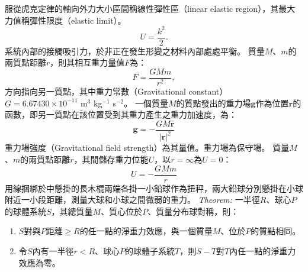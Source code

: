 \documentclass[a4paper,12pt]{article}
\begin{document}
服從虎克定律的軸向外力大小區間稱線性彈性區（linear elastic region），其最大力值稱彈性限度（elastic limit）。
\[U=\frac{k^2}{2}.\]
系統內部的接觸吸引力，於非正在發生形變之材料內部處處平衡。
質量$M$、$m$的兩質點距離$r$，則其相互重力量值$F$為：
\[F=\frac{GMm}{r^2},\]
方向指向另一質點，其中重力常數（Gravitational constant） $G = 6.67430\times 10^{-11}$ m$^3$ kg$^{-1}$ s$^{-2}$。
一個質量$M$的質點發出的重力場$\mathbf{g}$作為位置$\mathbf{r}$的函數，即另一質點在該位置受到其重力產生之重力加速度，為：
\[\mathbf{g}=-\frac{GM\hat{\mathbf{r}}}{|\mathbf{r}|^2}\]
重力場強度（Gravitational field strength）為其量值。重力場為保守場。
質量$M$、$m$的兩質點距離$r$，其間儲存重力位能$U$，以$r=\infty$為$U=0$：
\[U=-\frac{GMm}{r}\]
用線捆綁於中懸掛的長木棍兩端各掛一小鉛球作為扭秤，兩大鉛球分別懸掛在小球附近一小段距離，測量大球和小球之間微弱的重力。
\textit{Theorem:} 一半徑$R$、球心$P$的球體系統$S$，其總質量$M$、質心位於$P$、質量分布球對稱，則：
\begin{enumerate}
\item $S$對與$P$距離$\geq R$的任一點的淨重力效應，與一個質量$M$、位於$P$的質點相同。
\item 令$S$內有一半徑$r<R$、球心$P$的球體子系統$T$，則$S-T$對$T$內任一點的淨重力效應為零。
\end{enumerate}
\end{document}
